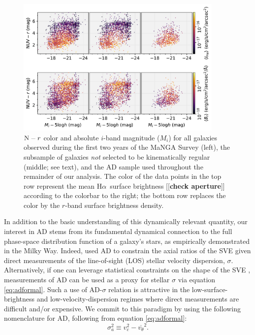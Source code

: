 \documentclass[apj,iop,revtex4,numberedappendix]{emulateapj}
\newcommand{\comment}[2][todo]{{\color{#1}[[{\bf #2}]]}}
\newcommand{\halpha}{H$\alpha$}
\begin{document}
\begin{figure}
%
\begin{center}
%
\includegraphics[width=0.9\textwidth]{figs/cmd_flux.pdf}
%
\end{center}
%
\caption{
%
${\rm N} - r$ color and absolute $i$-band magnitude ($M_i$) for all
galaxies observed during the first two years of the MaNGA Survey (left),
the subsample of galaxies {\em not} selected to be kinematically regular
(middle; see text), and the AD sample used throughout the remainder of
our analysis.  The color of the data points in the top row represent the
mean \halpha\ surface brightness \comment{check aperture} according to
the colorbar to the right; the bottom row replaces the color by the
$r$-band surface brightness density.
%
}
%
\label{fig:sample}
%
\end{figure}

In addition to the basic understanding of this dynamically relevant
quantity, our interest in AD stems from its fundamental dynamical
connection to the full phase-space distribution function of a galaxy's
stars, as empirically demonstrated in the Milky Way.  Indeed,
\citet{2011ApJ...742...18W} used AD to constrain the axial ratios of the
SVE given direct measurements of the line-of-sight (LOS) stellar
velocity dispersion, $\sigma$.  Alternatively, if one can leverage
statistical constraints on the shape of the SVE
\citep[e.g.][]{2012MNRAS.423.2726G}, measurements of AD can be used as a
proxy for stellar $\sigma$ via equation \ref{eq:adformal}.  Such a use
of AD-$\sigma$ relation is attractive in the low-surface-brightness and
low-velocity-dispersion regimes where direct measurements are difficult
and/or expensive.  We commit to this paradigm by using the following
nomenclature for AD, following from equation \ref{eq:adformal}:
%
\begin{equation}
%
\sigma_a^2 \equiv v_c^2 - \overline{v_\theta}^2.
%
\label{eq:addef}
%
\end{equation}
\end{document}
